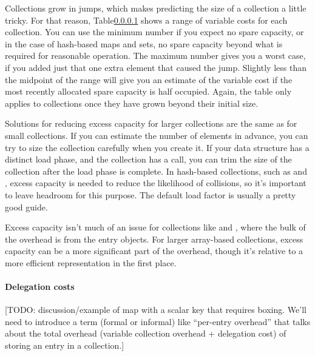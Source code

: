Collections grow in jumps, which makes predicting the size of a collection a
little tricky.  For that reason, Table\ref{} shows
a range of variable costs for each collection.  You can use the minimum
number if you expect no spare capacity, or in the case of hash-based maps
and sets, no spare capacity beyond what is required for reasonable operation.
The maximum number gives you a worst case, if you added just that one extra element that caused
the jump. Slightly less than the midpoint of the range will give you an estimate of the
variable cost if the most recently allocated spare capacity is half occupied.
Again, the table only applies to collections once they have grown beyond their
initial size.

Solutions for reducing excess capacity for larger collections are the same as
for small collections. If you can estimate the number of elements in advance,
you can try to size the collection carefully when you create it.  If your data structure has a
distinct load phase, and the collection has a  call, you can
trim the size of the collection after the load phase is complete. In hash-based collections, such as
 and , excess capacity is needed to reduce the
likelihood of collisions, so it's important to leave headroom for this
purpose. The default load factor is usually a pretty good guide. 

Excess capacity isn't much of an issue for collections like
 and , where the bulk of the overhead is from the entry objects.
For larger array-based collections, excess capacity can be a more significant
part of the overhead, though it's relative to a more efficient representation in the
first place. 


\paragraph{Delegation costs}
[TODO: discussion/example of map with a scalar key that requires boxing.  We'll
need to introduce a term (formal or informal) like ``per-entry overhead'' that
talks about the total overhead (variable collection overhead + delegation cost) of storing an entry
in a collection.]

